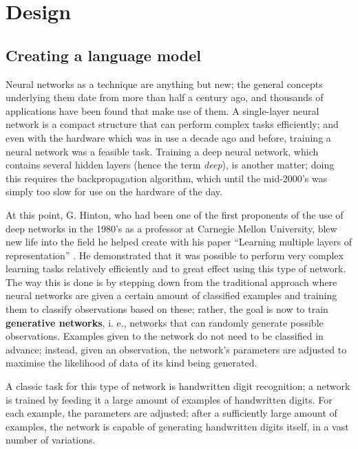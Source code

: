 \chapter{Design}
\label{chp:design} %

\section{Creating a language model}
\label{sec:training-nn}

Neural networks as a technique are anything but new; the general
concepts underlying them date from more than half a century ago, and
thousands of applications have been found that make use of them. A
single-layer neural network is a compact structure that can perform
complex tasks efficiently; and even with the hardware which was in use
a decade ago and before, training a neural network was a feasible
task. Training a deep neural network, which contains several hidden
layers (hence the term \textit{deep}), is another matter; doing this
requires the backpropagation algorithm, which until the mid-2000's
was simply too slow for use on the hardware of the day. 

At this point, G. Hinton, who had been one of the first proponents of
the use of deep networks in the 1980's as a professor at Carnegie
Mellon University, blew new life into the field he helped create with
his paper ``Learning multiple layers of representation''
\citep{hinton2007learning}. He demonstrated that it was possible to
perform very complex learning tasks relatively efficiently and to
great effect using this type of network. The way this is done is by
stepping down from the traditional approach where neural networks are
given a certain amount of classified examples and training them to
classify observations based on these; rather, the goal is now to train
\textbf{generative networks}, i. e., networks that can randomly
generate possible observations. Examples given to the network do not
need to be classified in advance; instead, given an observation, the
network's parameters are adjusted to maximise the likelihood of data
of its kind being generated.

A classic task for this type of network is handwritten digit
recognition; a network is trained by feeding it a large amount of
examples of handwritten digits. For each example, the parameters are
adjusted; after a sufficiently large amount of examples, the network
is capable of generating handwritten digits itself, in a vast number
of variations.

